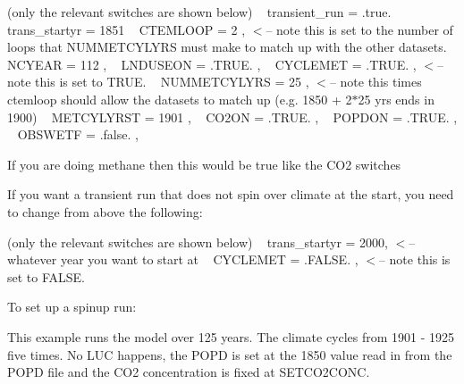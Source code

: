 (only the relevant switches are shown below) ~\newline
 transient\+\_\+run = .true. ~\newline
 trans\+\_\+startyr = 1851 ~\newline
 C\+T\+E\+M\+L\+O\+O\+P = 2 , $<$-- note this is set to the number of loops that N\+U\+M\+M\+E\+T\+C\+Y\+L\+Y\+R\+S must make to match up with the other datasets. ~\newline
 N\+C\+Y\+E\+A\+R = 112 , ~\newline
 L\+N\+D\+U\+S\+E\+O\+N = .T\+R\+U\+E. , ~\newline
 C\+Y\+C\+L\+E\+M\+E\+T = .T\+R\+U\+E. , $<$-- note this is set to T\+R\+U\+E. ~\newline
 N\+U\+M\+M\+E\+T\+C\+Y\+L\+Y\+R\+S = 25 , $<$-- note this times ctemloop should allow the datasets to match up (e.\+g. 1850 + 2$\ast$25 yrs ends in 1900) ~\newline
 M\+E\+T\+C\+Y\+L\+Y\+R\+S\+T = 1901 , ~\newline
 C\+O2\+O\+N = .T\+R\+U\+E. , ~\newline
 P\+O\+P\+D\+O\+N = .T\+R\+U\+E. , ~\newline
 O\+B\+S\+W\+E\+T\+F = .false. ,

If you are doing methane then this would be true like the C\+O2 switches 



If you want a transient run that does not spin over climate at the start, you need to change from above the following\+:

(only the relevant switches are shown below) ~\newline
 trans\+\_\+startyr = 2000, $<$-- whatever year you want to start at ~\newline
 C\+Y\+C\+L\+E\+M\+E\+T = .F\+A\+L\+S\+E. , $<$-- note this is set to F\+A\+L\+S\+E. 



To set up a spinup run\+:

This example runs the model over 125 years. The climate cycles from 1901 -\/ 1925 five times. No L\+U\+C happens, the P\+O\+P\+D is set at the 1850 value read in from the P\+O\+P\+D file and the C\+O2 concentration is fixed at S\+E\+T\+C\+O2\+C\+O\+N\+C.

